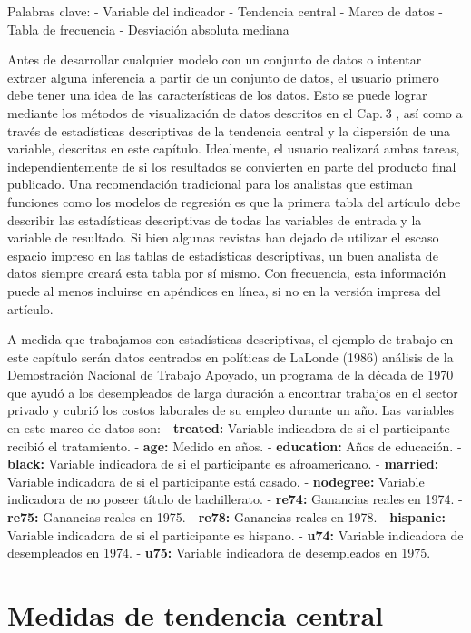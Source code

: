\documentclass[
]{book}
\begin{document}
Palabras clave:
- Variable del indicador
- Tendencia central
- Marco de datos
- Tabla de frecuencia
- Desviación absoluta mediana

Antes de desarrollar cualquier modelo con un conjunto de datos o intentar extraer alguna inferencia a partir de un conjunto de datos, el usuario primero debe tener una idea de las características de los datos. Esto se puede lograr mediante los métodos de visualización de datos descritos en el Cap. 3 , así como a través de estadísticas descriptivas de la tendencia central y la dispersión de una variable, descritas en este capítulo. Idealmente, el usuario realizará ambas tareas, independientemente de si los resultados se convierten en parte del producto final publicado. Una recomendación tradicional para los analistas que estiman funciones como los modelos de regresión es que la primera tabla del artículo debe describir las estadísticas descriptivas de todas las variables de entrada y la variable de resultado. Si bien algunas revistas han dejado de utilizar el escaso espacio impreso en las tablas de estadísticas descriptivas, un buen analista de datos siempre creará esta tabla por sí mismo. Con frecuencia, esta información puede al menos incluirse en apéndices en línea, si no en la versión impresa del artículo.

A medida que trabajamos con estadísticas descriptivas, el ejemplo de trabajo en este capítulo serán datos centrados en políticas de LaLonde (1986) análisis de la Demostración Nacional de Trabajo Apoyado, un programa de la década de 1970 que ayudó a los desempleados de larga duración a encontrar trabajos en el sector privado y cubrió los costos laborales de su empleo durante un año. Las variables en este marco de datos son:
- \textbf{treated:} Variable indicadora de si el participante recibió el tratamiento.
- \textbf{age:} Medido en años.
- \textbf{education:} Años de educación.
- \textbf{black:} Variable indicadora de si el participante es afroamericano.
- \textbf{married:} Variable indicadora de si el participante está casado.
- \textbf{nodegree:} Variable indicadora de no poseer título de bachillerato.
- \textbf{re74:} Ganancias reales en 1974.
- \textbf{re75:} Ganancias reales en 1975.
- \textbf{re78:} Ganancias reales en 1978.
- \textbf{hispanic:} Variable indicadora de si el participante es hispano.
- \textbf{u74:} Variable indicadora de desempleados en 1974.
- \textbf{u75:} Variable indicadora de desempleados en 1975.

\hypertarget{medidas-de-tendencia-central}{%
\section*{Medidas de tendencia central}\label{medidas-de-tendencia-central}}
\end{document}
